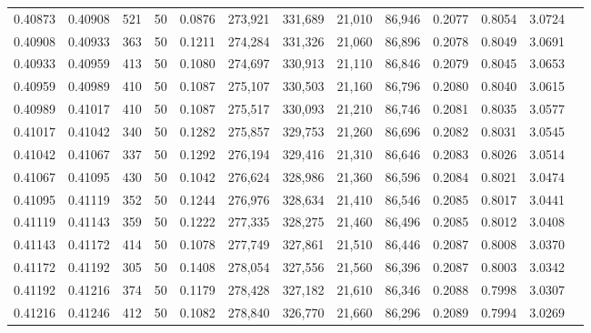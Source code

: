 \begin{tabular}{rrrrrrrrrrrrr}
0.40873 & 0.40908 &   521 &  50 &                                     0.0876 & 273,921 & 331,689 &  21,010 &  86,946 & 0.2077 & 0.8054 & 3.0724 \\
0.40908 & 0.40933 &   363 &  50 &                                     0.1211 & 274,284 & 331,326 &  21,060 &  86,896 & 0.2078 & 0.8049 & 3.0691 \\
0.40933 & 0.40959 &   413 &  50 &                                     0.1080 & 274,697 & 330,913 &  21,110 &  86,846 & 0.2079 & 0.8045 & 3.0653 \\
0.40959 & 0.40989 &   410 &  50 &                                     0.1087 & 275,107 & 330,503 &  21,160 &  86,796 & 0.2080 & 0.8040 & 3.0615 \\
0.40989 & 0.41017 &   410 &  50 &                                     0.1087 & 275,517 & 330,093 &  21,210 &  86,746 & 0.2081 & 0.8035 & 3.0577 \\
0.41017 & 0.41042 &   340 &  50 &                                     0.1282 & 275,857 & 329,753 &  21,260 &  86,696 & 0.2082 & 0.8031 & 3.0545 \\
0.41042 & 0.41067 &   337 &  50 &                                     0.1292 & 276,194 & 329,416 &  21,310 &  86,646 & 0.2083 & 0.8026 & 3.0514 \\
0.41067 & 0.41095 &   430 &  50 &                                     0.1042 & 276,624 & 328,986 &  21,360 &  86,596 & 0.2084 & 0.8021 & 3.0474 \\
0.41095 & 0.41119 &   352 &  50 &                                     0.1244 & 276,976 & 328,634 &  21,410 &  86,546 & 0.2085 & 0.8017 & 3.0441 \\
0.41119 & 0.41143 &   359 &  50 &                                     0.1222 & 277,335 & 328,275 &  21,460 &  86,496 & 0.2085 & 0.8012 & 3.0408 \\
0.41143 & 0.41172 &   414 &  50 &                                     0.1078 & 277,749 & 327,861 &  21,510 &  86,446 & 0.2087 & 0.8008 & 3.0370 \\
0.41172 & 0.41192 &   305 &  50 &                                     0.1408 & 278,054 & 327,556 &  21,560 &  86,396 & 0.2087 & 0.8003 & 3.0342 \\
0.41192 & 0.41216 &   374 &  50 &                                     0.1179 & 278,428 & 327,182 &  21,610 &  86,346 & 0.2088 & 0.7998 & 3.0307 \\
0.41216 & 0.41246 &   412 &  50 &                                     0.1082 & 278,840 & 326,770 &  21,660 &  86,296 & 0.2089 & 0.7994 & 3.0269 \\

\end{tabular}
